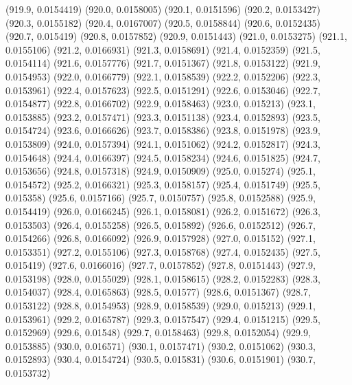 {					(919.9, 0.0154419)
					(920.0, 0.0158005)
					(920.1, 0.0151596)
					(920.2, 0.0153427)
					(920.3, 0.0155182)
					(920.4, 0.0167007)
					(920.5, 0.0158844)
					(920.6, 0.0152435)
					(920.7, 0.015419)
					(920.8, 0.0157852)
					(920.9, 0.0151443)
					(921.0, 0.0153275)
					(921.1, 0.0155106)
					(921.2, 0.0166931)
					(921.3, 0.0158691)
					(921.4, 0.0152359)
					(921.5, 0.0154114)
					(921.6, 0.0157776)
					(921.7, 0.0151367)
					(921.8, 0.0153122)
					(921.9, 0.0154953)
					(922.0, 0.0166779)
					(922.1, 0.0158539)
					(922.2, 0.0152206)
					(922.3, 0.0153961)
					(922.4, 0.0157623)
					(922.5, 0.0151291)
					(922.6, 0.0153046)
					(922.7, 0.0154877)
					(922.8, 0.0166702)
					(922.9, 0.0158463)
					(923.0, 0.015213)
					(923.1, 0.0153885)
					(923.2, 0.0157471)
					(923.3, 0.0151138)
					(923.4, 0.0152893)
					(923.5, 0.0154724)
					(923.6, 0.0166626)
					(923.7, 0.0158386)
					(923.8, 0.0151978)
					(923.9, 0.0153809)
					(924.0, 0.0157394)
					(924.1, 0.0151062)
					(924.2, 0.0152817)
					(924.3, 0.0154648)
					(924.4, 0.0166397)
					(924.5, 0.0158234)
					(924.6, 0.0151825)
					(924.7, 0.0153656)
					(924.8, 0.0157318)
					(924.9, 0.0150909)
					(925.0, 0.015274)
					(925.1, 0.0154572)
					(925.2, 0.0166321)
					(925.3, 0.0158157)
					(925.4, 0.0151749)
					(925.5, 0.015358)
					(925.6, 0.0157166)
					(925.7, 0.0150757)
					(925.8, 0.0152588)
					(925.9, 0.0154419)
					(926.0, 0.0166245)
					(926.1, 0.0158081)
					(926.2, 0.0151672)
					(926.3, 0.0153503)
					(926.4, 0.0155258)
					(926.5, 0.015892)
					(926.6, 0.0152512)
					(926.7, 0.0154266)
					(926.8, 0.0166092)
					(926.9, 0.0157928)
					(927.0, 0.015152)
					(927.1, 0.0153351)
					(927.2, 0.0155106)
					(927.3, 0.0158768)
					(927.4, 0.0152435)
					(927.5, 0.015419)
					(927.6, 0.0166016)
					(927.7, 0.0157852)
					(927.8, 0.0151443)
					(927.9, 0.0153198)
					(928.0, 0.0155029)
					(928.1, 0.0158615)
					(928.2, 0.0152283)
					(928.3, 0.0154037)
					(928.4, 0.0165863)
					(928.5, 0.01577)
					(928.6, 0.0151367)
					(928.7, 0.0153122)
					(928.8, 0.0154953)
					(928.9, 0.0158539)
					(929.0, 0.015213)
					(929.1, 0.0153961)
					(929.2, 0.0165787)
					(929.3, 0.0157547)
					(929.4, 0.0151215)
					(929.5, 0.0152969)
					(929.6, 0.01548)
					(929.7, 0.0158463)
					(929.8, 0.0152054)
					(929.9, 0.0153885)
					(930.0, 0.016571)
					(930.1, 0.0157471)
					(930.2, 0.0151062)
					(930.3, 0.0152893)
					(930.4, 0.0154724)
					(930.5, 0.015831)
					(930.6, 0.0151901)
					(930.7, 0.0153732)
}
